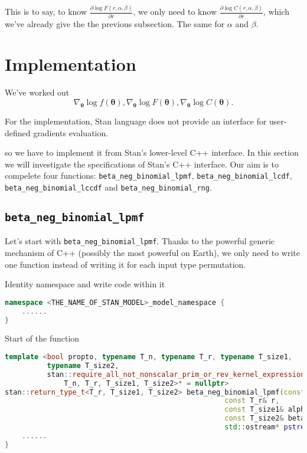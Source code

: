 \documentclass[11pt]{article}
\begin{document}
This is to say, to know $\frac{\partial \log F(r,\alpha,\beta)}{\partial r}$, we only need to know $\frac{\partial \log C(r,\alpha,\beta)}{\partial r}$, which we've already give the the previous subsection. The same for $\alpha$ and $\beta$.





\section{Implementation}


We've worked out
\begin{equation}
\nabla _{\boldsymbol {\theta}}\log f(\boldsymbol\theta), \nabla _{\boldsymbol {\theta}}\log F(\boldsymbol\theta), \nabla _{\boldsymbol {\theta}}\log C(\boldsymbol\theta).
\end{equation}




For the implementation, Stan language does not provide an interface for user-defined gradients evaluation.


 so we have to implement it from Stan's lower-level C++ interface. In this section we will investigate the specifications of Stan's C++ interface. Our aim is to compelete four functions: \verb|beta_neg_binomial_lpmf|, \verb|beta_neg_binomial_lcdf|, \verb|beta_neg_binomial_lccdf| and \verb|beta_neg_binomial_rng|.


\cprotect\subsection{\verb|beta_neg_binomial_lpmf|}
Let's start with \verb|beta_neg_binomial_lpmf|. Thanks to the powerful generic mechanism of C++ (possibly the most powerful on Earth), we only need to write one function instead of writing it for each input type permutation.

Identity namespace and write code within it
\begin{lstlisting}[language=c++, style=lgeneral]
namespace <THE_NAME_OF_STAN_MODEL>_model_namespace {
	......
}
\end{lstlisting}


Start of the function

\begin{lstlisting}[language=c++, style=lgeneral]
template <bool propto, typename T_n, typename T_r, typename T_size1,
          typename T_size2,
          stan::require_all_not_nonscalar_prim_or_rev_kernel_expression_t<
              T_n, T_r, T_size1, T_size2>* = nullptr>
stan::return_type_t<T_r, T_size1, T_size2> beta_neg_binomial_lpmf(const T_n& n, 
                                                    const T_r& r,
                                                    const T_size1& alpha,
                                                    const T_size2& beta,
                                                    std::ostream* pstream__) {	
	......
}
\end{lstlisting}
\end{document}
